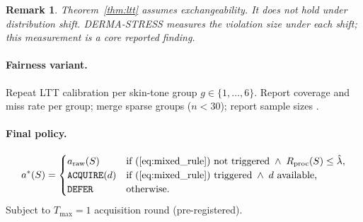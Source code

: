 \documentclass[conference]{IEEEtran}
\newtheorem{remark}{Remark}
\newcommand{\1}{\mathbf{1}}
\begin{document}
\begin{remark}
Theorem~\ref{thm:ltt} assumes exchangeability. It does \emph{not} hold
under distribution shift. DERMA-STRESS measures the violation size under
each shift; this measurement is a core reported finding.
\end{remark}

\paragraph{Fairness variant.}
Repeat LTT calibration per skin-tone group $g\in\{1,\ldots,6\}$.
Report coverage and miss rate per group; merge sparse groups ($n<30$);
report sample sizes \cite{lu2021fair}.

\paragraph{Final policy.}
\begin{equation}
  a^*(S) =
  \begin{cases}
    a_{\text{raw}}(S) & \text{if (\ref{eq:mixed_rule}) not triggered}
                        \;\wedge\; R_{\text{proc}}(S) \leq \hat{\lambda},\\
    \texttt{ACQUIRE}(d) & \text{if (\ref{eq:mixed_rule}) triggered}
                          \;\wedge\; d \text{ available,}\\
    \texttt{DEFER} & \text{otherwise.}
  \end{cases}
  \label{eq:final_policy}
\end{equation}
Subject to $T_{\max}=1$ acquisition round (pre-registered).
\end{document}

